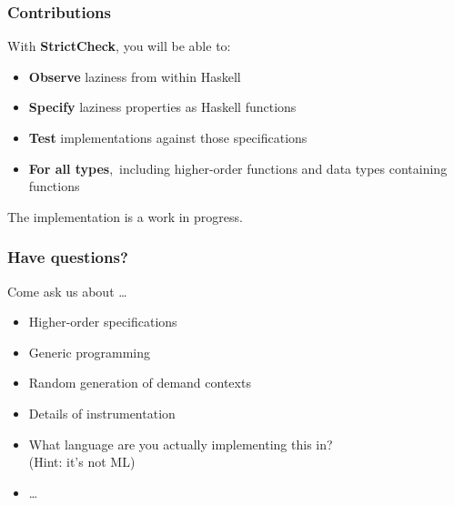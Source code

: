 \documentclass{beamer}
\begin{document}
\begin{frame}[fragile]
\frametitle{Contributions}
With \textbf{StrictCheck}, you will be able to:
\begin{itemize}
\item \textbf{Observe} laziness from within Haskell
\item \textbf{Specify} laziness properties as Haskell functions
\item \textbf{Test} implementations against those specifications
\item \textbf{For all types},\footnotemark\, including higher-order functions and
      data types containing functions
\end{itemize}
The implementation is a work in progress.
\end{frame}


\begin{frame}[fragile]
\frametitle{Have questions?}
Come ask us about \dots
\begin{itemize}
\item Higher-order specifications
\item Generic programming
\item Random generation of demand contexts
\item Details of instrumentation
\item What language are you actually implementing this in? \\ (Hint: it's not ML)
\item[] \dots
\end{itemize}
\end{frame}
\end{document}
